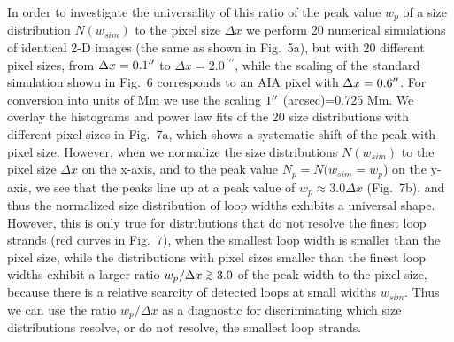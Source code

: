 \documentclass[10pt,preprint]{aastex}  %
\def\arcsec{\hbox{$^{\prime\prime}$}}
\def\gapprox{\lower.4ex\hbox{$\;\buildrel >\over{\scriptstyle\sim}\;$}}
\begin{document}
In order to investigate the universality of this ratio of the
peak value $w_p$ of a size distribution $N(w_{sim})$ to the
pixel size $\Delta x$ we perform 20 numerical simulations
of identical 2-D images (the same as shown in Fig.~5a),
but with 20 different pixel sizes, from $\Delta x=0.1 \arcsec$
to $\Delta x=2.0$ \arcsec, while the scaling of the standard simulation
shown in Fig.~6 corresponds to an AIA pixel with $\Delta x = 0.6\arcsec$.
For conversion into units of Mm we use the scaling $1\arcsec$ (arcsec)=0.725 Mm.
We overlay the histograms and power law fits of the 20 size 
distributions with different pixel sizes in Fig.~7a, which shows a 
systematic shift of the peak with pixel size. However, when we normalize
the size distributions $N(w_{sim})$ to the pixel size $\Delta x$ on the x-axis,
and to the peak value $N_p=N(w_{sim}=w_p$) on the y-axis, we see that the peaks
line up at a peak value of $w_p \approx 3.0 \Delta x$ (Fig.~7b), and thus
the normalized size distribution of loop widths exhibits a
universal shape. However, this is only true for distributions
that do not resolve the finest loop strands (red curves in Fig.~7), 
when the smallest loop width is smaller than the pixel size, 
while the distributions with 
pixel sizes smaller than the finest loop widths exhibit
a larger ratio $w_p/\Delta x \gapprox 3.0$ of the peak width to the pixel 
size, because there is a relative scarcity of detected loops
at small widths $w_{sim}$. Thus we can use the ratio $w_p/\Delta x$
as a diagnostic for discriminating which size distributions 
resolve, or do not resolve, the smallest loop strands.    
\end{document}
